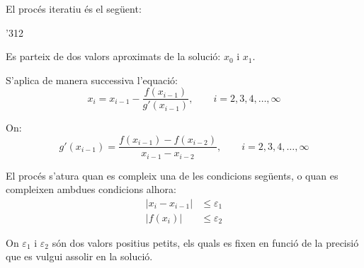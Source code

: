 \begin{center}
    
    \label{pic:metode-secant}
\end{center}


El procés iteratiu és el següent:

\begin{dingautolist}{'312}
    \item Es parteix de dos valors aproximats de la solució: $x_0$ i $x_1$.

    \item   S'aplica de manera successiva l'equació:
            \begin{equation}\label{eq:secant-1}
              x_i = x_{i-1} - \frac{f(x_{i-1})}{g'(x_{i-1})}, \qquad i=2,3,4,\dots,\infty
            \end{equation}

            On:
            \begin{equation}\label{eq:secant-2}
              g'(x_{i-1}) = \frac{f(x_{i-1}) - f(x_{i-2}) } {x_{i-1} - x_{i-2}}, \qquad i=2,3,4,\dots,\infty
            \end{equation}

    \item   El procés s'atura quan es compleix una de les condicions següents, o quan es compleixen ambdues condicions alhora:
            \begin{subequations}\begin{align}
              |x_i - x_{i-1}| &\leq \varepsilon_1 \\
              |f(x_i)| &\leq \varepsilon_2
            \end{align}\end{subequations}

            On $\varepsilon_1$ i $\varepsilon_2$ són dos valors positius petits, els quals es fixen en funció de la precisió que es vulgui assolir en la solució.
\end{dingautolist}


